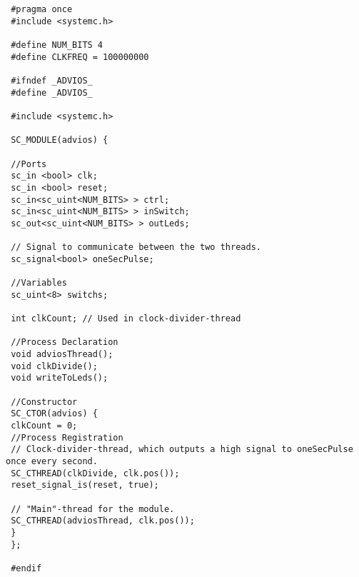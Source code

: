  \begin{lstlisting}
 #pragma once
 #include <systemc.h>
 
 #define NUM_BITS 4
 #define CLKFREQ = 100000000 
 
 #ifndef _ADVIOS_
 #define _ADVIOS_
 
 #include <systemc.h>
 
 SC_MODULE(advios) {
 
 //Ports
 sc_in <bool> clk;
 sc_in <bool> reset;
 sc_in<sc_uint<NUM_BITS> > ctrl;
 sc_in<sc_uint<NUM_BITS> > inSwitch;
 sc_out<sc_uint<NUM_BITS> > outLeds;
 
 // Signal to communicate between the two threads.
 sc_signal<bool> oneSecPulse;
 
 //Variables
 sc_uint<8> switchs;
 
 int clkCount; // Used in clock-divider-thread
 
 //Process Declaration
 void adviosThread();
 void clkDivide();
 void writeToLeds();
 
 //Constructor
 SC_CTOR(advios) {
 clkCount = 0;
 //Process Registration
 // Clock-divider-thread, which outputs a high signal to oneSecPulse once every second.
 SC_CTHREAD(clkDivide, clk.pos());
 reset_signal_is(reset, true);
 
 // "Main"-thread for the module.
 SC_CTHREAD(adviosThread, clk.pos());
 }
 };
 
 #endif
 \end{lstlisting}
 \label{lst:advios_h}
 
